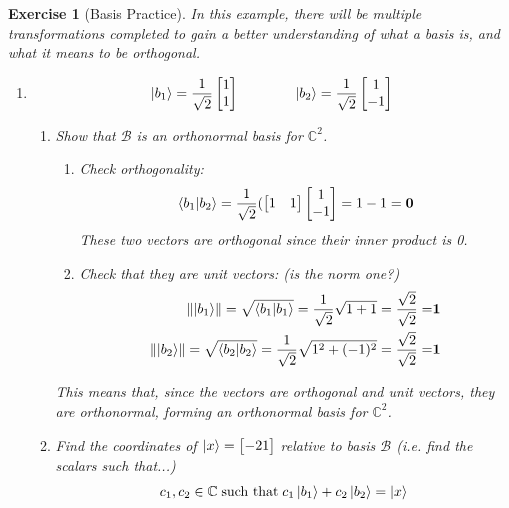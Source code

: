 \documentclass[12pt]{article}
\theoremstyle{plain}
\theoremstyle{nonumberplain}
\theoremstyle{plain}
\newtheorem{exercise}[lemma]{Exercise}
\theoremstyle{nonumberplain}
\newcommand\1{{\bf 1}}
\newcommand{\bmat}[1]{\begin{bmatrix*} #1 \end{bmatrix*}} %
\newcommand{\C}{\mathbb{C}} %
\newcommand{\<}{\left\langle}
\renewcommand{\>}{\right\rangle}
\newcommand{\norm}[1]{\left\lVert#1\right\rVert} %
\begin{document}
\begin{exercise}  [Basis Practice]  In this example, there will be multiple transformations completed to gain a better understanding of what a basis is, and what it means to be orthogonal. \leavevmode\linebreak  
\begin{enumerate}
\item 
\begin{equation} \renewcommand{\blacklozenge}{}
\ket{b_1} = \frac{1}{\sqrt{2}}\bmat{1\\ 1} \qquad\qquad \ket{b_2} = \frac{1}{\sqrt{2}}\bmat{1\\ -1}
\end{equation}
	\begin{enumerate}
	\item Show that $\mathcal{B}$ is an orthonormal basis for $\C^2$.\\
		\begin{enumerate}
		\item Check orthogonality:\\
		\begin{equation*}
		\braket{b_1|b_2} = \frac{1}{\sqrt{2}}(\bmat{1 & 1}\bmat{1\\ -1} = 1 - 1 = \mathbf{0}
		\end{equation*}
		These two vectors are orthogonal since their inner product is 0. \\
		\item Check that they are unit vectors: (is the norm one?) \\
		\begin{equation*}
		\begin{split}
		\norm{\ket{b_1}} = \sqrt{\braket{b_1|b_1}} = \frac{1}{\sqrt{2}}\sqrt{1+1} = \frac{\sqrt{2}}{\sqrt{2}} = &\mathbf{1}\\
		\norm{\ket{b_2}} = \sqrt{\braket{b_2|b_2}} = \frac{1}{\sqrt{2}}\sqrt{1^2+(-1)^2} = \frac{\sqrt{2}}{\sqrt{2}} = &\mathbf{1}
		\end{split}
		\end{equation*}
		\end{enumerate}
		This means that, since the vectors are orthogonal and unit vectors, they are orthonormal, forming an orthonormal basis for $\C^2$.
	\pagebreak
	\item Find the coordinates of $\ket{x} = \bmat{-2 1}$ relative to basis $\mathcal{B}$ (i.e. find the scalars such that...)
	\begin{equation*}
	\begin{split}
	c_1, c_2 \in \C\; \text{such that}\; c_1\ket{b_1} + c_2\ket{b_2} = \ket{x}\\\\

\end{split}
\end{equation*}
\end{enumerate}
\end{enumerate}
\end{exercise}
\end{document}
